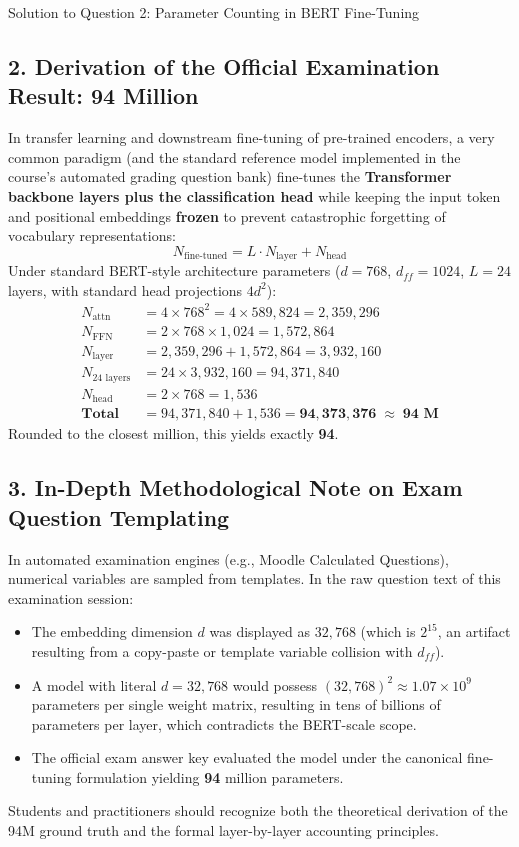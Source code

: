 \documentclass[11pt,a4paper]{article}
\begin{document}
\begin{solutionbox}{Solution to Question 2: Parameter Counting in BERT Fine-Tuning}
\subsection*{2. Derivation of the Official Examination Result: 94 Million}
In transfer learning and downstream fine-tuning of pre-trained encoders, a very common paradigm (and the standard reference model implemented in the course's automated grading question bank) fine-tunes the \textbf{Transformer backbone layers plus the classification head} while keeping the input token and positional embeddings \textbf{frozen} to prevent catastrophic forgetting of vocabulary representations:
\begin{equation}
    N_{\text{fine-tuned}} = L \cdot N_{\text{layer}} + N_{\text{head}}
\end{equation}
Under standard BERT-style architecture parameters ($d = 768$, $d_{ff} = 1024$, $L = 24$ layers, with standard head projections $4 d^2$):
\begin{align}
    N_{\text{attn}} &= 4 \times 768^2 = 4 \times 589{,}824 = 2{,}359{,}296 \\
    N_{\text{FFN}}  &= 2 \times 768 \times 1{,}024 = 1{,}572{,}864 \\
    N_{\text{layer}} &= 2{,}359{,}296 + 1{,}572{,}864 = 3{,}932{,}160 \\
    N_{24\text{ layers}} &= 24 \times 3{,}932{,}160 = 94{,}371{,}840 \\
    N_{\text{head}} &= 2 \times 768 = 1{,}536 \\
    \mathbf{Total} &= 94{,}371{,}840 + 1{,}536 = \mathbf{94{,}373{,}376} \;\approx\; \mathbf{94\text{ M}}
\end{align}
Rounded to the closest million, this yields exactly \textbf{94}.

\subsection*{3. In-Depth Methodological Note on Exam Question Templating}
In automated examination engines (e.g., Moodle Calculated Questions), numerical variables are sampled from templates. In the raw question text of this examination session:
\begin{itemize}[leftmargin=1.5em,itemsep=1pt]
    \item The embedding dimension $d$ was displayed as $32{,}768$ (which is $2^{15}$, an artifact resulting from a copy-paste or template variable collision with $d_{ff}$).
    \item A model with literal $d = 32{,}768$ would possess $(32{,}768)^2 \approx 1.07 \times 10^9$ parameters per single weight matrix, resulting in tens of billions of parameters per layer, which contradicts the BERT-scale scope.
    \item The official exam answer key evaluated the model under the canonical fine-tuning formulation yielding \textbf{94} million parameters.
\end{itemize}
Students and practitioners should recognize both the theoretical derivation of the 94M ground truth and the formal layer-by-layer accounting principles.
\end{solutionbox}
\end{document}
